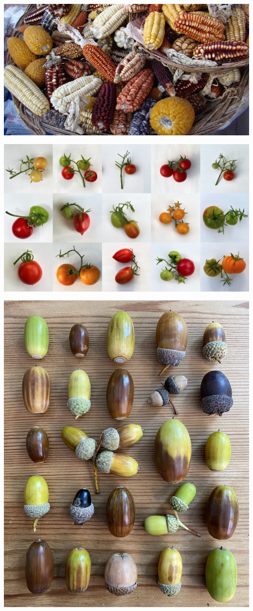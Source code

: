 \documentclass[
  ignorenonframetext,
  aspectratio=169]{beamer}
\begin{document}
\begin{frame}{}
\protect\hypertarget{section-3}{}
\includegraphics[width=0.9\linewidth]{../images/maize_diversity}
\end{frame}

\begin{frame}{}
\protect\hypertarget{section-4}{}
\begin{center}\includegraphics[width=0.9\linewidth]{../images/tomato_diversity} \end{center}
\end{frame}

\begin{frame}{}
\protect\hypertarget{section-5}{}
\begin{center}\includegraphics[width=0.44\linewidth]{../images/chestnut_diversity} \end{center}
\end{frame}
\end{document}
